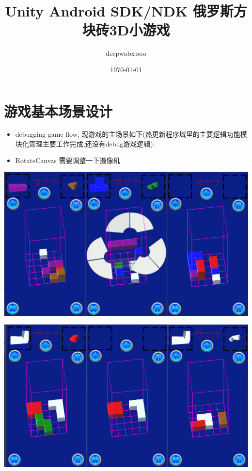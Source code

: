 \documentclass[9pt, b5paper]{article}
\author{deepwaterooo}
\date{\today}
\title{Unity Android SDK/NDK 俄罗斯方块砖3D小游戏}
\begin{document}
\maketitle
\tableofcontents


\section{游戏基本场景设计}
\label{sec-1}
\begin{itemize}
\item debugging game flow, 现游戏的主场景如下(热更新程序域里的主要逻辑功能模块化管理主要工作完成,还没有debug游戏逻辑):
\item RotateCanvas 需要调整一下摄像机
\end{itemize}

\includegraphics[width=.9\linewidth]{./pic/readme_20221103_111227.png}

\includegraphics[width=.9\linewidth]{./pic/readme_20221102_272232.png}
\end{document}

